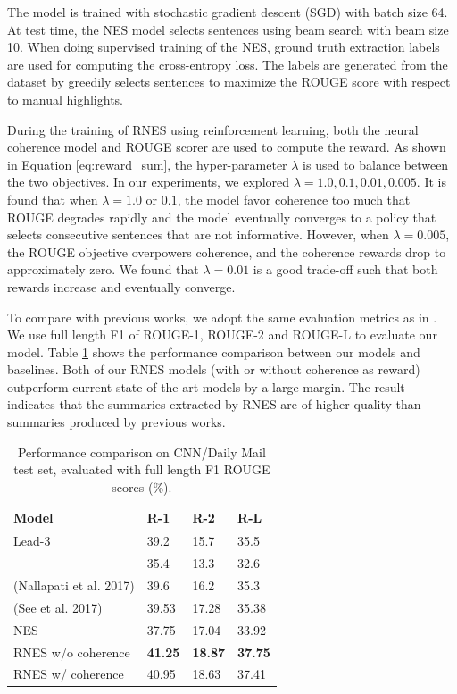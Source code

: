 \documentclass[letterpaper]{article} %
\begin{document}
	The model is trained with stochastic gradient descent (SGD) with batch size 64. At test time, the NES model selects sentences using beam search with beam size 10. When doing supervised training of the NES, ground truth extraction labels are used for computing the cross-entropy loss. The labels are generated from the dataset by greedily selects sentences to maximize the ROUGE score with respect to manual highlights.
	
	During the training of RNES using reinforcement learning, both the neural coherence model and ROUGE scorer are used to compute the reward. As shown in Equation \ref{eq:reward_sum}, the hyper-parameter $\lambda$ is used to balance between the two objectives. In our experiments, we explored $\lambda=1.0, 0.1, 0.01, 0.005$. It is found that when $\lambda=1.0$ or $0.1$, the model favor coherence too much that ROUGE degrades rapidly and the model eventually converges to a policy that selects consecutive sentences that are not informative. However, when $\lambda = 0.005$, the ROUGE objective overpowers coherence, and the coherence rewards drop to approximately zero. We found that $\lambda=0.01$ is a good trade-off such that both rewards increase and eventually converge.
	
	To compare with previous works, we adopt the same evaluation metrics as in \cite{SummaRuNNer}. We use full length F1 of ROUGE-1, ROUGE-2 and ROUGE-L to evaluate our model. Table \ref{tab:rouge_cnn_dm} shows the performance comparison between our models and baselines. Both of our RNES models (with or without coherence as reward) outperform current state-of-the-art models by a large margin. The result indicates that the summaries extracted by RNES are of higher quality than summaries produced by previous works. 
	
	\begin{table}[ht]
		\centering
		\caption{Performance comparison on CNN/Daily Mail test set, evaluated with full length F1 ROUGE scores (\%).}
		\label{tab:rouge_cnn_dm}
		
		\begin{tabular}{|p{32mm}|p{10mm}|p{10mm}|p{10mm}|}
			\hline
			Model&R-1&R-2&R-L\\\hline
			Lead-3&39.2&15.7&35.5\\
			\cite{nallapati_ramesh_abstractive_2016}&35.4&13.3&32.6\\
			(Nallapati et al. 2017) &39.6&16.2&35.3\\
			(See et al. 2017)&39.53&17.28&35.38\\
			NES & 37.75 & 17.04 & 33.92\\\hline
			RNES w/o coherence&\textbf{41.25}&\textbf{18.87}&\textbf{37.75}\\
			RNES w/ coherence&40.95&18.63&37.41\\\hline
		\end{tabular}
	\end{table}
	
\end{document}
